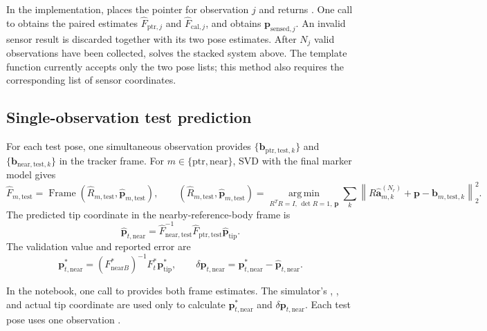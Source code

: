 \documentclass[11pt]{article}
\newcommand{\vct}[1]{\bm{#1}}
\newcommand{\Frame}{\operatorname{Frame}}
\newcommand{\norm}[1]{\left\|#1\right\|_2}
\begin{document}
In the implementation,  places the pointer
for observation $j$ and returns . One call to
 obtains the paired estimates
$\widehat F_{\mathrm{ptr},j}$ and $\widehat F_{\mathrm{cal},j}$, and
 obtains
$\vct{p}_{\mathrm{sensed},j}$. An invalid sensor result is discarded together
with its two pose estimates. After $N_j$ valid observations have been collected,
 solves the stacked system above. The template function
 currently accepts only the two pose lists; this
method also requires the corresponding list of sensor coordinates.

\subsection{Single-observation test prediction}
For each test pose, one simultaneous observation provides
$\{\vct{b}_{\mathrm{ptr},\mathrm{test},k}\}$ and
$\{\vct{b}_{\mathrm{near},\mathrm{test},k}\}$ in the tracker frame.  For
$m\in\{\mathrm{ptr},\mathrm{near}\}$, SVD with the final marker model gives
\begin{equation}
\widehat F_{m,\mathrm{test}}
=\Frame(\widehat R_{m,\mathrm{test}},
\widehat{\vct{p}}_{m,\mathrm{test}}),
\qquad
(\widehat R_{m,\mathrm{test}},\widehat{\vct{p}}_{m,\mathrm{test}})
=\underset{R^TR=I,\,\det R=1,\,\vct{p}}{\operatorname{arg\,min}}
\sum_k
\norm{
R\widehat{\vct{a}}_{m,k}^{(N_r)}+\vct{p}
-\vct{b}_{m,\mathrm{test},k}}^2.
\end{equation}
The predicted tip coordinate in the nearby-reference-body frame is
\begin{equation}
\boxed{
\widehat{\vct{p}}_{t,\mathrm{near}}
=\widehat F_{\mathrm{near},\mathrm{test}}^{-1}
\widehat F_{\mathrm{ptr},\mathrm{test}}
\widehat{\vct{p}}_{\mathrm{tip}}.}
\end{equation}
The validation value and reported error are
\begin{equation}
\vct{p}_{t,\mathrm{near}}^*
=(F_{\mathrm{near}B}^*)^{-1}F_t^*\vct{p}_{\mathrm{tip}}^*,
\qquad
\delta\vct{p}_{t,\mathrm{near}}
=\vct{p}_{t,\mathrm{near}}^*
-\widehat{\vct{p}}_{t,\mathrm{near}}.
\end{equation}

In the notebook, one call to
provides both frame estimates.  The simulator's
,
, and actual tip coordinate are used only
to calculate $\vct{p}_{t,\mathrm{near}}^*$ and
$\delta\vct{p}_{t,\mathrm{near}}$.  Each test pose uses one observation
\cite{assignment,repo}.
\end{document}
